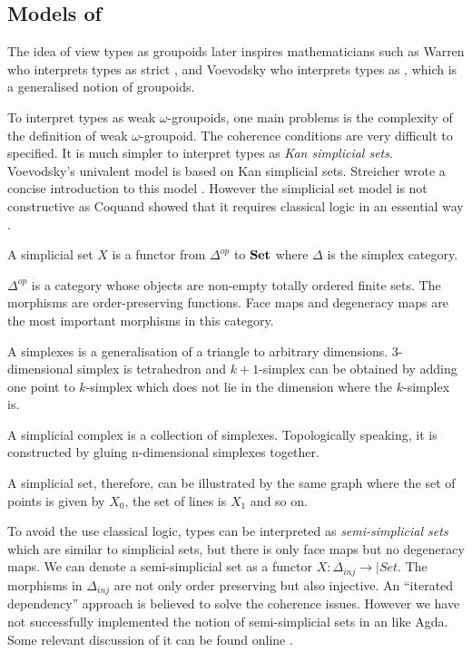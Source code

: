 \subsection{Models of \hott}



The idea of view types as groupoids later inspires mathematicians such as Warren \cite{Warren} who interprets types as strict \og, and Voevodsky \cite{klv:ssetmodel} who interprets types as \wog, which is a generalised notion of groupoids. 

To interpret types as weak $\omega$-groupoids, one main problems is
the complexity of the definition of weak $\omega$-groupoid. The
coherence conditions are very difficult to specified.
It is much simpler to interpret types as \emph{Kan simplicial sets}.
Voevodsky's univalent model\cite{klv:ssetmodel} is based on Kan simplicial sets. 
 Streicher wrote a concise introduction to this model \cite{DBLP:dblp_journals/japll/Streicher14}. 
However the simplicial set model is not constructive as Coquand showed
that it requires classical logic in an essential way \cite{TC:sset}.

\begin{remark}
A simplicial set $X$ is a functor from $\Delta^{op}$ to $\operatorname{\mathbf{Set}}$ where
$\Delta$ is the simplex category.

$\Delta^{op}$ is a category whose objects are non-empty totally ordered
finite sets. The morphisms are order-preserving functions. 
Face maps and degeneracy maps are the most important morphisms in this
category.

A simplexes is a generalisation of a triangle to arbitrary
dimensions. $3$-dimensional simplex is tetrahedron and $k+1$-simplex can
be obtained by adding one point to $k$-simplex which does not lie in the
dimension where the $k$-simplex is.

A simplicial complex is a collection of simplexes. Topologically speaking, it
is constructed by gluing n-dimensional simplexes together. 

A simplicial set, therefore, can be illustrated by the same graph where
the set of points is given by $X_0$, the set of lines is $X_1$ and so
on.
\end{remark}


To avoid the use classical logic, types can be interpreted as \emph{semi-simplicial sets} which are similar to simplicial sets, but there is only face maps
but no degeneracy maps. We can denote a semi-simplicial set as a
functor $X : \Delta_{inj} \rightarrow |Set$. The morphisms in $\Delta_{inj}$ are not only order preserving but also injective.
An “iterated dependency” approach is believed to solve the coherence
issues. However we have not successfully implemented the notion of semi-simplicial sets in an \itt like Agda. Some relevant discussion of it can be found online \cite{ssSet}.


